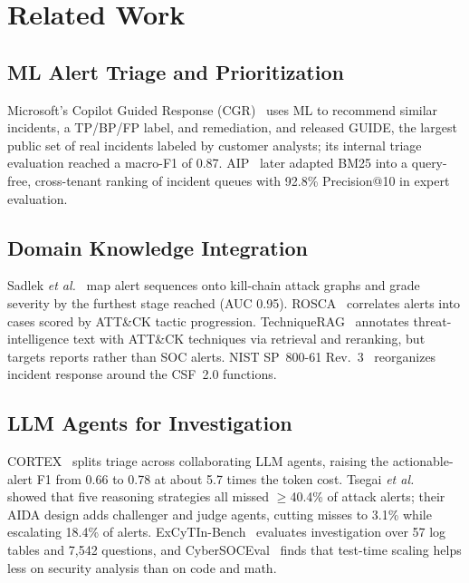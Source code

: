 \documentclass[conference]{IEEEtran}
\begin{document}
\section{Related Work}\label{sec:related}

\subsection{ML Alert Triage and Prioritization}
Microsoft's Copilot Guided Response (CGR)~\cite{freitas2024cgr} uses ML
to recommend similar incidents, a TP/BP/FP label, and remediation, and
released GUIDE, the largest public set of real incidents labeled by
customer analysts; its internal triage evaluation reached a macro-F1
of 0.87. AIP~\cite{freitas2026aip} later adapted BM25 into a
query-free, cross-tenant ranking of incident queues with 92.8\%
Precision@10 in expert evaluation.

\subsection{Domain Knowledge Integration}
Sadlek \emph{et al.}~\cite{sadlek2025} map alert sequences onto
kill-chain attack graphs and grade severity by the furthest stage
reached (AUC 0.95). ROSCA~\cite{garcia2025rosca} correlates alerts into
cases scored by ATT\&CK tactic progression. TechniqueRAG~\cite{lekssays2025}
annotates threat-intelligence text with ATT\&CK techniques via
retrieval and reranking, but targets reports rather than SOC alerts.
NIST SP~800-61 Rev.~3~\cite{nist80061r3} reorganizes incident response
around the CSF~2.0 functions.

\subsection{LLM Agents for Investigation}
CORTEX~\cite{wei2025cortex} splits triage across collaborating LLM
agents, raising the actionable-alert F1 from 0.66 to 0.78 at about 5.7
times the token cost. Tsegai \emph{et al.}~\cite{tsegai2026} showed that
five reasoning strategies all missed $\geq$40.4\% of attack alerts;
their AIDA design adds challenger and judge agents, cutting misses to
3.1\% while escalating 18.4\% of alerts. ExCyTIn-Bench~\cite{wu2025excytin}
evaluates investigation over 57 log tables and 7{,}542 questions, and
CyberSOCEval~\cite{deason2025} finds that test-time scaling helps less
on security analysis than on code and math.
\end{document}

